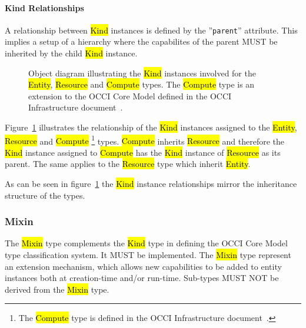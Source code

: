 \documentclass[10pt,a4paper]{article}
\begin{document}
\paragraph*{Kind Relationships}
A relationship between \hl{Kind} instances is defined by the ''{\tt parent}'' attribute. This implies a setup of a hierarchy where the capabilites of the parent MUST be inherited by the child \hl{Kind} instance.

\begin{figure}[!h]
  {\centering {} \par}
  \caption{Object diagram illustrating the \hl{Kind} instances
    involved for the \hl{Entity}, \hl{Resource} and \hl{Compute}
    types. The \hl{Compute} type is an extension to the OCCI Core
    Model defined in the OCCI Infrastructure
    document~\cite{occi:infrastructure}.}
  \label{fig:kind_relationships}
\end{figure}

Figure~\ref{fig:kind_relationships} illustrates the relationship of
the \hl{Kind} instances assigned to the \hl{Entity}, \hl{Resource} and
\hl{Compute}%
\footnote{The \hl{Compute} type is defined in the OCCI Infrastructure
 document~\cite{occi:infrastructure}.}
types.
%
\hl{Compute} inherits \hl{Resource} and therefore the \hl{Kind}
instance assigned to \hl{Compute} has the \hl{Kind} instance
of \hl{Resource} as its parent.
The same applies to the \hl{Resource} type which
inherit \hl{Entity}.

As can be seen in figure~\ref{fig:kind_relationships} the \hl{Kind}
instance relationships mirror the inheritance structure of the types.

\subsubsection{Mixin}
\label{sec:mixin}
The \hl{Mixin} type complements the \hl{Kind} type in defining the
OCCI Core Model type classification system. It MUST be
implemented. The \hl{Mixin} type represent an extension mechanism,
which allows new capabilities to be added to entity
instances both at creation-time and/or run-time.
%
Sub-types MUST NOT be derived from the \hl{Mixin} type.
\end{document}
